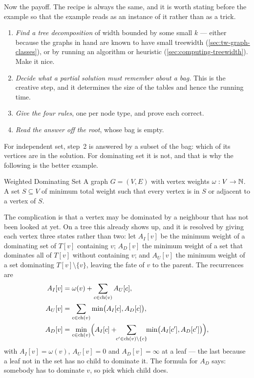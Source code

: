 Now the payoff. The recipe is always the same, and it is worth stating before
the example so that the example reads as an instance of it rather than as a
trick.

\begin{enumerate}[leftmargin=*]
  \item \emph{Find a tree decomposition} of width bounded by some small $k$ ---
        either because the graphs in hand are known to have small treewidth
        (\cref{sec:tw-graph-classes}), or by running an algorithm or heuristic
        (\cref{sec:computing-treewidth}). Make it nice.
  \item \emph{Decide what a partial solution must remember about a bag.} This
        is the creative step, and it determines the size of the tables and
        hence the running time.
  \item \emph{Give the four rules}, one per node type, and prove each correct.
  \item \emph{Read the answer off the root}, whose bag is empty.
\end{enumerate}

For independent set, step~2 is answered by a subset of the bag: which of its
vertices are in the solution. For dominating set it is not, and that is why the
following is the better example.

\begin{probdef}{Weighted Dominating Set}
  \instance A graph $G = (V,E)$ with vertex weights $\omega : V \to \mathbb{N}$.
  \question A set $S \subseteq V$ of minimum total weight such that every
  vertex is in $S$ or adjacent to a vertex of $S$.
\end{probdef}

The complication is that a vertex may be dominated by a neighbour that has not
been looked at yet. On a tree this already shows up, and it is resolved by
giving each vertex three states rather than two: let $A_I[v]$ be the minimum
weight of a dominating set of $T[v]$ containing $v$; $A_D[v]$ the minimum weight
of a set that dominates all of $T[v]$ without containing $v$; and $A_U[v]$ the
minimum weight of a set dominating $T[v] \setminus \{v\}$, leaving the fate of
$v$ to the parent. The recurrences are
\begin{align*}
  A_I[v] &= \omega(v) + \sum_{c \in \mathrm{ch}(v)} A_U[c], \\
  A_U[v] &= \sum_{c \in \mathrm{ch}(v)} \min\bigl(A_I[c], A_D[c]\bigr), \\
  A_D[v] &= \min_{c \in \mathrm{ch}(v)} \Bigl( A_I[c] +
            \!\!\sum_{c' \in \mathrm{ch}(v) \setminus \{c\}}\!\!
            \min\bigl(A_I[c'], A_D[c']\bigr) \Bigr),
\end{align*}
with $A_I[v] = \omega(v)$, $A_U[v] = 0$ and $A_D[v] = \infty$ at a leaf --- the
last because a leaf not in the set has no child to dominate it. The formula for
$A_D$ says: somebody has to dominate $v$, so pick which child does.

